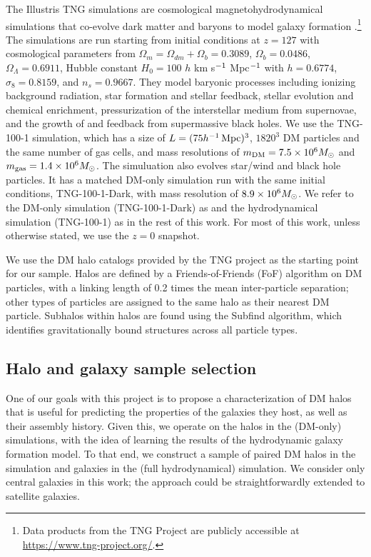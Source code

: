 The Illustris TNG simulations are cosmological magnetohydrodynamical simulations that co-evolve dark matter and baryons to model galaxy formation \citep{springel_first_2018,nelson_first_2018,pillepich_simulating_2018,naiman_first_2018,marinacci_first_2018}.\footnote{Data products from the TNG Project are publicly accessible at \url{https://www.tng-project.org/}.}
The simulations are run starting from initial conditions at $z=127$ with cosmological parameters from \cite{ade_planck_2016} $\Omega_m = \Omega_{dm} + \Omega_b = 0.3089$, $\Omega_b = 0.0486$, $\Omega_\Lambda = 0.6911$, Hubble constant $H_0 = 100$ $h$ km s$^{-1}$ Mpc$^{-1}$ with $h = 0.6774$, $\sigma_8 = 0.8159$, and $n_s = 0.9667$.
They model baryonic processes including ionizing background radiation, star formation and stellar feedback, stellar evolution and chemical enrichment, pressurization of the interstellar medium from supernovae, and the growth of and feedback from supermassive black holes.   
We use the TNG-100-1 simulation, which has a size of $L = (75 h^{-1}\,\mathrm{Mpc})^3$, $1820^3$ DM particles and the same number of gas cells, and mass resolutions of $m_\text{DM} = 7.5 \times 10^6 M_\mathrm{\odot}$ and $m_\text{gas} = 1.4 \times 10^6 M_\mathrm{\odot}$.
The simuluation also evolves star/wind and black hole particles.
It has a matched DM-only simulation run with the same initial conditions, TNG-100-1-Dark, with mass resolution of $8.9 \times 10^6 M_\mathrm{\odot}$.
We refer to the DM-only simulation (TNG-100-1-Dark) as \dark and the hydrodynamical simulation (TNG-100-1) as \hydro in the rest of this work.
For most of this work, unless otherwise stated, we use the $z=0$ snapshot.

We use the DM halo catalogs provided by the TNG project as the starting point for our sample.
Halos are defined by a Friends-of-Friends (FoF) algorithm on DM particles, with a linking length of 0.2 times the mean inter-particle separation; other types of particles are assigned to the same halo as their nearest DM particle.
Subhalos within halos are found using the Subfind algorithm, which identifies gravitationally bound structures across all particle types.


\subsection{Halo and galaxy sample selection}
\label{sec:select}

One of our goals with this project is to propose a characterization of DM halos that is useful for predicting the properties of the galaxies they host, as well as their assembly history.
Given this, we operate on the halos in the \dark (DM-only) simulations, with the idea of learning the results of the hydrodynamic galaxy formation model.
To that end, we construct a sample of paired DM halos in the \dark simulation and galaxies in the \hydro (full hydrodynamical) simulation. 
We consider only central galaxies in this work; the approach could be straightforwardly extended to satellite galaxies.

